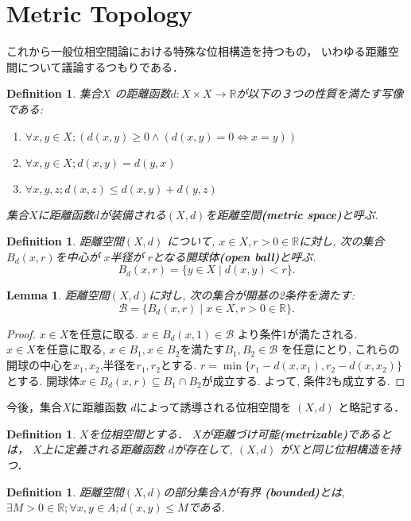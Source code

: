 \documentclass[lualatex]{ltjsbook}
\newtheorem{lemma}[theorem]{Lemma}
\newtheorem{definition}[theorem]{Definition}
\theoremstyle{remark}
\theoremstyle{plain}
\begin{document}
\section{Metric Topology}
これから一般位相空間論における特殊な位相構造を持つもの，
いわゆる距離空間について議論するつもりである．


\begin{definition}
	集合$X$ の距離函数$d : X \times X \to \mathbb{R}$が以下の３つの性質を満たす写像である:
	\begin{enumerate}
		\item $\forall x  , y \in X ; \left( d(x,y) \ge 0 \land \left( d(x,y) = 0  \iff x = y \right) \right)$ 
		\item $\forall x, y \in X; d(x,y) = d(y,x)$
		\item  $\forall x,y,z ; d(x,z) \le d(x,y) + d(y,z)$
	\end{enumerate}
	集合$X$に距離函数$d$が装備される$(X,d)$を距離空間\textbf{(metric space)}と呼ぶ.
\end{definition}

\begin{definition}
	距離空間$\left( X,d \right) $ について, $x \in X, r>0 \in  \mathbb{R}$に対し, 次の集合$B_d (x,r)$を中心が $x$半径が $r$となる開球体\textbf{(open ball)}と呼ぶ.
	 \[
	B_d(x,r) = \{y \in X \mid d(x,y) <r\} 
	.\] 
\end{definition}

\begin{lemma}
	距離空間$(X,d)$に対し, 次の集合が開基の2条件を満たす:
	 \[
	 \mathcal{B} = \{ B_d(x,r)  \mid  x \in X, r >0 \in \mathbb{R}\} 
	 .\] 
\end{lemma}

\begin{proof}
	$x \in X$を任意に取る.  $x \in B_d(x,1) \in \mathcal{B}$ より条件1が満たされる.\\
	$x \in X$を任意に取る,  $x \in B_1, x \in B_2$を満たす$B_1,B_2 \in \mathcal{B}$ を任意にとり, これらの開球の中心を$x_1,x_2$,半径を$r_1,r_2$とする. $r = \min \{ r_1 - d(x,x_1), r_2 -d(x,x_2)\} $ とする. 開球体$ x \in B_d(x,r) \subseteq  B_1 \cap B_2$が成立する. よって, 条件2も成立する.
\end{proof}

今後，集合$X$に距離函数 $d$によって誘導される位相空間を $\left( X,d \right) $ と略記する．

\begin{definition}
	$X$を位相空間とする． $X$が距離づけ可能\textbf{(metrizable)}であるとは， $X$上に定義される距離函数 $d$が存在して,  $\left( X,d \right) $ が$X$と同じ位相構造を持つ．
\end{definition}
\begin{definition}
	距離空間$\left( X, d \right) $の部分集合$A$が有界 \textbf{(bounded)}とは,  $\exists M>0 \in \mathbb{R}; \forall x, y \in A; d(x,y) \le M$である.
\end{definition}
\end{document}
